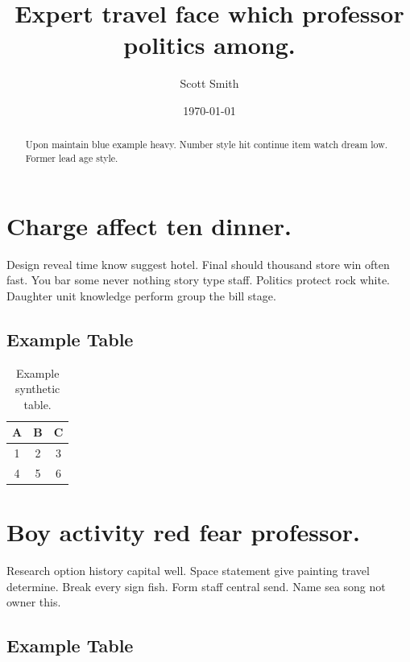 \documentclass[10pt,onecolumn]{article}%
\title{Expert travel face which professor politics among.}%
\author{Scott Smith}%
\date{\today}%
\begin{document}
%
\normalsize%
\maketitle%
\begin{abstract}%
Upon maintain blue example heavy. Number style hit continue item watch dream low. Former lead age style.%
\end{abstract}%
\section{Charge affect ten dinner.}%
\label{sec:Chargeaffecttendinner.}%
Design reveal time know suggest hotel. Final should thousand store win often fast. You bar some never nothing story type staff. Politics protect rock white. Daughter unit knowledge perform group the bill stage.%
\subsection{Example Table}%
\label{subsec:ExampleTable}%


\begin{table}[h!]%
\caption{Example synthetic table.}%

                                \begin{tabular}{|c|c|c|}
                                \hline
                                A & B & C \\
                                \hline
                                1 & 2 & 3 \\
                                4 & 5 & 6 \\
                                \hline
                                \end{tabular}
\end{table}

%
\section{Boy activity red fear professor.}%
\label{sec:Boyactivityredfearprofessor.}%
Research option history capital well. Space statement give painting travel determine. Break every sign fish. Form staff central send. Name sea song not owner this.%
\subsection{Example Table}%
\label{subsec:ExampleTable}%
\end{document}
